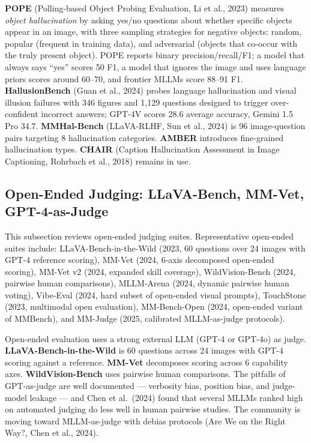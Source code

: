 \textbf{POPE} (Polling-based Object Probing Evaluation, Li et al., 2023) measures \emph{object hallucination} by asking yes/no questions about whether specific objects appear in an image, with three sampling strategies for negative objects: random, popular (frequent in training data), and adversarial (objects that co-occur with the truly present object). POPE reports binary precision/recall/F1; a model that always says ``yes'' scores 50 F1, a model that ignores the image and uses language priors scores around 60--70, and frontier MLLMs score 88--91 F1. \textbf{HallusionBench} (Guan et al., 2024) probes language hallucination and visual illusion failures with 346 figures and 1,129 questions designed to trigger over-confident incorrect answers; GPT-4V scores 28.6 average accuracy, Gemini 1.5 Pro 34.7. \textbf{MMHal-Bench} (LLaVA-RLHF, Sun et al., 2024) is 96 image-question pairs targeting 8 hallucination categories. \textbf{AMBER} introduces fine-grained hallucination types. \textbf{CHAIR} (Caption Hallucination Assessment in Image Captioning, Rohrbach et al., 2018) remains in use.

\subsection{Open-Ended Judging: LLaVA-Bench, MM-Vet, GPT-4-as-Judge}\label{open-ended-judging-llava-bench-mm-vet-gpt-4-as-judge}

This subsection reviews open-ended judging suites. Representative open-ended suites include: LLaVA-Bench-in-the-Wild (2023, 60 questions over 24 images with GPT-4 reference scoring), MM-Vet (2024, 6-axis decomposed open-ended scoring), MM-Vet v2 (2024, expanded skill coverage), WildVision-Bench (2024, pairwise human comparisons), MLLM-Arena (2024, dynamic pairwise human voting), Vibe-Eval (2024, hard subset of open-ended visual prompts), TouchStone (2023, multimodal open evaluation), MM-Bench-Open (2024, open-ended variant of MMBench), and MM-Judge (2025, calibrated MLLM-as-judge protocols).

Open-ended evaluation uses a strong external LLM (GPT-4 or GPT-4o) as judge. \textbf{LLaVA-Bench-in-the-Wild} is 60 questions across 24 images with GPT-4 scoring against a reference. \textbf{MM-Vet} decomposes scoring across 6 capability axes. \textbf{WildVision-Bench} uses pairwise human comparisons. The pitfalls of GPT-as-judge are well documented --- verbosity bias, position bias, and judge-model leakage --- and Chen et al.~(2024) found that several MLLMs ranked high on automated judging do less well in human pairwise studies. The community is moving toward MLLM-as-judge with debias protocols (Are We on the Right Way?, Chen et al., 2024).

